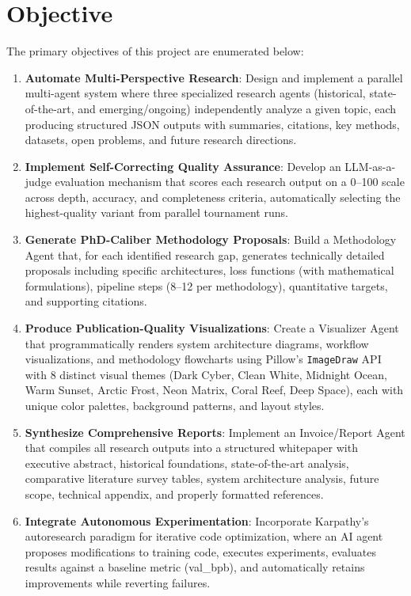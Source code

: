 \section{Objective}

The primary objectives of this project are enumerated below:

\begin{enumerate}[label=\arabic*., leftmargin=2cm]
\item \textbf{Automate Multi-Perspective Research}: Design and implement a parallel multi-agent system where three specialized research agents (historical, state-of-the-art, and emerging/ongoing) independently analyze a given topic, each producing structured JSON outputs with summaries, citations, key methods, datasets, open problems, and future research directions.

\item \textbf{Implement Self-Correcting Quality Assurance}: Develop an LLM-as-a-judge evaluation mechanism that scores each research output on a 0--100 scale across depth, accuracy, and completeness criteria, automatically selecting the highest-quality variant from parallel tournament runs.

\item \textbf{Generate PhD-Caliber Methodology Proposals}: Build a Methodology Agent that, for each identified research gap, generates technically detailed proposals including specific architectures, loss functions (with mathematical formulations), pipeline steps (8--12 per methodology), quantitative targets, and supporting citations.

\item \textbf{Produce Publication-Quality Visualizations}: Create a Visualizer Agent that programmatically renders system architecture diagrams, workflow visualizations, and methodology flowcharts using Pillow's \texttt{ImageDraw} API with 8 distinct visual themes (Dark Cyber, Clean White, Midnight Ocean, Warm Sunset, Arctic Frost, Neon Matrix, Coral Reef, Deep Space), each with unique color palettes, background patterns, and layout styles.

\item \textbf{Synthesize Comprehensive Reports}: Implement an Invoice/Report Agent that compiles all research outputs into a structured whitepaper with executive abstract, historical foundations, state-of-the-art analysis, comparative literature survey tables, system architecture analysis, future scope, technical appendix, and properly formatted references.

\item \textbf{Integrate Autonomous Experimentation}: Incorporate Karpathy's autoresearch paradigm for iterative code optimization, where an AI agent proposes modifications to training code, executes experiments, evaluates results against a baseline metric (val\_bpb), and automatically retains improvements while reverting failures.
\end{enumerate}

